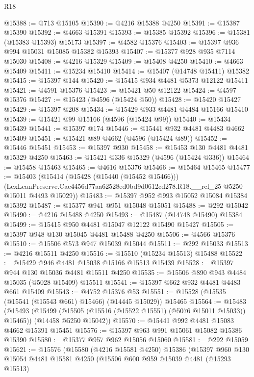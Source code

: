 \begin{lexlean}{R18}
\begin{coremodule}
@15388 := @713 @15105
@15390 := @4216 @15388 @4250
@15391 := @15387 @15390
@15392 := @4663 @15391
@15393 := @15385 @15392
@15396 := @15381 (@15383 @15393) @15173
@15397 := @4582 @15376
@15403 := @15397 @936 @994 @15031 @15085 @15382 @15393
@15407 := @15377 @928 @935 @7114 @15030
@15408 := @4216 @15329
@15409 := @15408 @4250
@15410 := @4663 @15409
@15411 := @15234 @15410
@15414 := @15407 (@14748 @15411) @15382
@15415 := @15397 @144
@15420 := @15415 @934 @4481 @5373 @12122 @15411
@15421 := @4591 @15376
@15423 := @15421 @50 @12122
@15424 := @4597 @15376
@15427 := @15423 (@4596 (@15424 @50))
@15428 := @15420 @15427
@15429 := @15397 @208
@15434 := @15429 @933 @4481 @4484 @15166 @15410
@15439 := @15421 @99 @15166 (@4596 (@15424 @99))
@15440 := @15434 @15439
@15441 := @15397 @174
@15446 := @15441 @932 @4481 @4483 @4662 @15409
@15451 := @15421 @89 @4662 (@4596 (@15424 @89))
@15452 := @15446 @15451
@15453 := @15397 @930
@15458 := @15453 @130 @4481 @4481 @15329 @4250
@15463 := @15421 @336 @15329 (@4596 (@15424 @336))
@15464 := @15458 @15463
@15465 := @4616 @15376
@15466 := @15464 @15465
@15477 := @15403
    (@15414
      (@15428 (@15440 (@15452 @15466)))
      (LexLeanPreserve.Cae4456d77aa62528ed0bd9d0612cd278.R18.__rel_25 @5250 @15011 @4493 @15029))
@15483 := @15397 @952 @993 @15052 @15084 @15384 @15392
@15487 := @15377 @941 @951 @15048 @15051
@15488 := @292 @15042
@15490 := @4216 @15488 @4250
@15493 := @15487 (@14748 @15490) @15384
@15499 := @15415 @950 @4481 @15047 @12122 @15490 @15427
@15505 := @15397 @948 @130 @15045 @4481 @15488 @4250
@15506 := @4566 @15376
@15510 := @15506 @573 @947 @15039 @15044
@15511 := @292 @15033
@15513 := @4216 @15511 @4250
@15516 := @15510 (@15234 @15513) @15488
@15522 := @15429 @946 @4481 @15038 @15166 @15513 @15439
@15528 := @15397 @944 @130 @15036 @4481 @15511 @4250
@15535 := @15506 @890 @943 @4484 @15035 (@5028 @15409) @15511
@15541 := @15397 @662 @932 @4481 @4483 @661 @15409
@15543 := @4752 @15376 @53
@15551 := @15528 (@15535 (@15541 (@15543 @661) @15466) (@14445 @15029)) @15465
@15564 := @15483
    (@15493
      (@15499 (@15505 (@15516 (@15522 @15551) (@5076 @15011 @15033)) @15465))
      (@14458 @5250 @15042))
@15570 := @15441 @992 @4481 @15083 @4662 @15391 @15451
@15576 := @15397 @963 @991 @15061 @15082 @15386 @15390
@15580 := @15377 @957 @962 @15056 @15060
@15581 := @292 @15059
@15621 := @15576
    (@15580
      (@4216 @15581 @4250)
      @15386
      (@15397
        @960
        @130
        @15054
        @4481
        @15581
        @4250
        (@15506
          @600
          @959
          @15039
          @4481
          (@15293 @15513)

\end{coremodule}
\end{lexlean}

